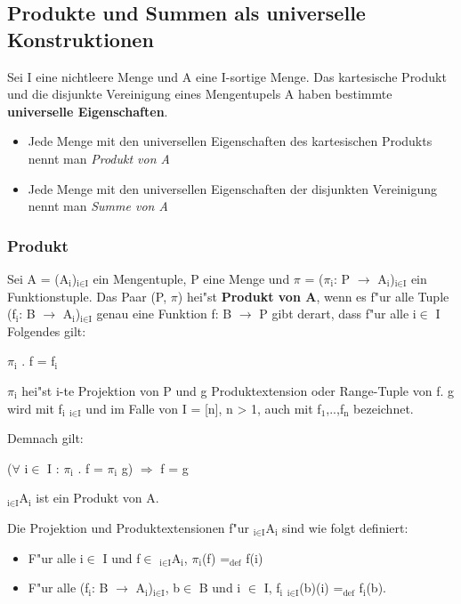 \documentclass[11pt]{article}
\begin{document}
\subsection{Produkte und Summen als universelle Konstruktionen}
\label{sec-2-3}

Sei I eine nichtleere Menge und A eine I-sortige Menge.
Das kartesische Produkt und die disjunkte Vereinigung eines Mengentupels A haben bestimmte \textbf{universelle Eigenschaften}.
\begin{itemize}
\item Jede Menge mit den universellen Eigenschaften des kartesischen Produkts nennt man \emph{Produkt von A}
\item Jede Menge mit den universellen Eigenschaften der disjunkten Vereinigung nennt man \emph{Summe von A}
\end{itemize}

\subsubsection{Produkt}
\label{sec-2-3-1}
Sei A = (A$_{\text{i}}$)$_{\text{i} \in \text{I}}$ ein Mengentuple, P eine Menge und $\pi$ = ($\pi$$_{\text{i}}$: P $\to$ A$_{\text{i}}$)$_{\text{i} \in \text{I}}$ ein Funktionstuple.
Das Paar (P, $\pi$) hei"st \textbf{Produkt von A}, wenn es f"ur alle Tuple (f$_{\text{i}}$: B $\to$ A$_{\text{i}}$)$_{\text{i} \in \text{I}}$ genau eine Funktion f: B $\to$ P gibt derart,
dass f"ur alle i$\in$ I Folgendes gilt:

\begin{center}
$\pi$$_{\text{i}}$ . f = f$_{\text{i}}$       
\end{center}

$\pi$$_{\text{i}}$ hei"st i-te Projektion von P und g Produktextension oder Range-Tuple von f. g wird mit \langle f$_{\text{i}}$ \rangle$_{\text{i} \in \text{I}}$ und im Falle
von I = [n], n > 1, auch mit \langle f$_{\text{1}}$,..,f$_{\text{n}}$ \rangle bezeichnet.

Demnach gilt:

\begin{center}
($\forall$ i$\in$ I : $\pi$$_{\text{i}}$ . f = $\pi$$_{\text{i}}$ \bigcirc g) $\Rightarrow$ f = g
\end{center}

\texttimes{}$_{\text{i} \in \text{I}}$A$_{\text{i}}$ ist ein Produkt von A.

Die Projektion und Produktextensionen f"ur \texttimes{}$_{\text{i} \in \text{I}}$A$_{\text{i}}$ sind wie folgt definiert:
\begin{itemize}
\item F"ur alle i$\in$ I und f$\in$ \texttimes{}$_{\text{i} \in \text{I}}$A$_{\text{i}}$, $\pi$$_{\text{i}}$(f) =$_{\text{def}}$ f(i)
\item F"ur alle (f$_{\text{i}}$: B $\to$ A$_{\text{i}}$)$_{\text{i} \in \text{I}}$, b$\in$ B und i $\in$ I, \langle f$_{\text{i}}$ \rangle$_{\text{i} \in \text{I}}$(b)(i) =$_{\text{def}}$ f$_{\text{i}}$(b).
\end{itemize}
\end{document}

